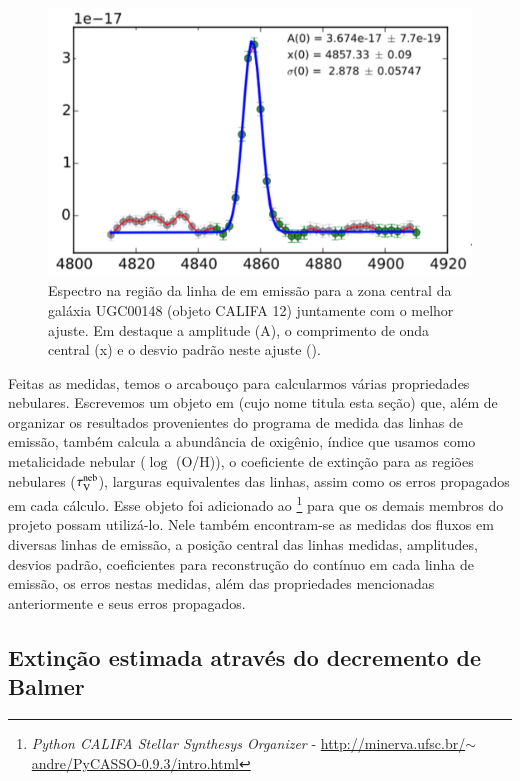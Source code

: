 \begin{figure}
	\centering
	\includegraphics[scale=0.6]{figuras/K0012-zone0-Hb.pdf}
	\caption[Exemplo de ajuste de linha de emissão.]
	{Espectro na região da linha de \Hbeta em emissão para a zona central da galáxia UGC00148 (objeto
CALIFA 12) juntamente com o melhor ajuste. Em destaque a amplitude (A), o comprimento de onda
central (x) e o desvio padrão neste ajuste (\sigma).}
	\label{fig:rgbline}
\end{figure}

Feitas as medidas, temos o arcabouço para calcularmos várias propriedades nebulares. Escrevemos um
objeto em \pyt (cujo nome titula esta seção) que, além de organizar os resultados provenientes do
programa de medida das linhas de emissão, também calcula a abundância de oxigênio, índice que
usamos como metalicidade nebular ($\log$ (O/H)), o coeficiente de extinção para as regiões nebulares
($\tau_{\mathrm{V}}^{\mathrm{neb}}$), larguras equivalentes das linhas, assim como os erros propagados em cada cálculo. Esse
objeto foi adicionado ao \pycasso\footnote{{\em Python CALIFA Stellar Synthesys Organizer} - 
\href{http://minerva.ufsc.br/~andre/PyCASSO-0.9.3/intro.html}
{http://minerva.ufsc.br/$\sim$andre/PyCASSO-0.9.3/intro.html}} \citep{CidFernandes.etal.2013a}
para que os demais membros do projeto possam utilizá-lo. Nele também encontram-se as medidas dos
fluxos em diversas linhas de emissão, a posição central das linhas medidas, amplitudes, desvios
padrão, coeficientes para reconstrução do contínuo em cada linha de emissão, os erros nestas
medidas, além das propriedades mencionadas anteriormente e seus erros propagados.

\subsection{Extinção estimada através do decremento de Balmer}
\label{sec:emline:datacube:tauvneb}

